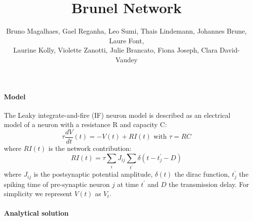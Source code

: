 \documentclass[a4paper]{article}
\begin{document}
\title{Brunel Network}
\author{Bruno Magalhaes, Gael Reganha, Leo Sumi, Thais Lindemann, Johannes Brune, Laure Font,\\ Laurine Kolly, Violette Zanotti, Julie Brancato, Fiona Joseph, Clara David-Vaudey}
\maketitle

\paragraph{Model}

The Leaky integrate-and-fire (IF) neuron model is described as an electrical model of a neuron with a resistance R and capacity C:
\begin{equation}
  \tau \frac{dV}{dt}(t) = -V(t) + RI(t) \text{ with } \tau = R C 
  \label{equation_diff}
\end{equation}
where $RI(t)$ is the network contribution:
\begin{equation}
   RI(t) = \tau \sum_{i} J_{ij} \sum_{t^\prime} \delta (t-t^\prime _{j} -D)
  \label{equation_current}
\end{equation}
where $J_{ij}$ is the postsynaptic potential amplitude, 
$\delta (t)$ the dirac function, $t^\prime _{j}$ the spiking time of pre-synaptic neuron $j$ at time $t^\prime$ and 
$D$ the transmission delay. For simplicity we represent $V(t)$ as $V_t$. \\

\paragraph{Analytical solution}
\end{document}
